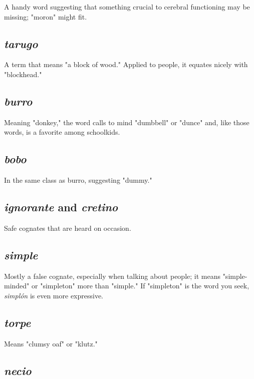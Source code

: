 \documentclass[14pt,a4paper,oneside]{memoir}
\begin{document}
A handy word suggesting that something crucial to
cerebral functioning may be missing; "moron" might fit.

\subsection{\emph{tarugo}}

A term that means "a block of wood." Applied to
people, it equates nicely with "blockhead."

\subsection{\emph{burro}}

Meaning "donkey," the word calls to mind "dumbbell" or "dunce" and, like those words, is a favorite among schoolkids.

\subsection{\emph{bobo}}

In the same class as burro, suggesting "dummy."

\subsection{\emph{ignorante} and \emph{cretino}}

Safe cognates that are heard on occasion.

\subsection{\emph{simple}}

Mostly a false cognate, especially when talking
about people; it means "simple-minded" or "simpleton" more than
"simple." If "simpleton" is the word you seek, \emph{simplón} is even more
expressive.

\subsection{\emph{torpe}}

Means "clumsy oaf" or "klutz."

\subsection{\emph{necio}}
\end{document}
